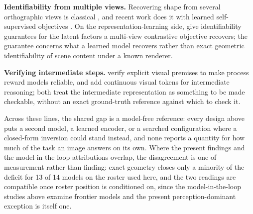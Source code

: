 \textbf{Identifiability from multiple views.} Recovering shape from several orthographic views is classical
\citep{tomasi1992factorization}, and recent work does it with learned self-supervised objectives
\citep{gaussiancad2026}. On the representation-learning side, \citet{daunhawer2023identifiability} give
identifiability guarantees for the latent factors a multi-view contrastive objective recovers; the guarantee
concerns what a learned model recovers rather than exact geometric identifiability of scene content under a
known renderer.

\textbf{Verifying intermediate steps.} \citet{groundscore2603} verify explicit visual premises to make process
reward models reliable, and \citet{cvt2511} add continuous visual tokens for intermediate reasoning; both
treat the intermediate representation as something to be made checkable, without an exact ground-truth
reference against which to check it.

Across these lines, the shared gap is a model-free reference: every design above puts a second model, a
learned encoder, or a searched configuration where a closed-form inversion could stand instead, and none
reports a quantity for how much of the task an image answers on its own. Where the present findings and the
model-in-the-loop attributions overlap, the disagreement is one of measurement rather than finding: exact
geometry closes only a minority of the deficit for 13 of 14 models on the roster used here, and the two
readings are compatible once roster position is conditioned on, since the model-in-the-loop studies above
examine frontier models and the present perception-dominant exception is itself one.
